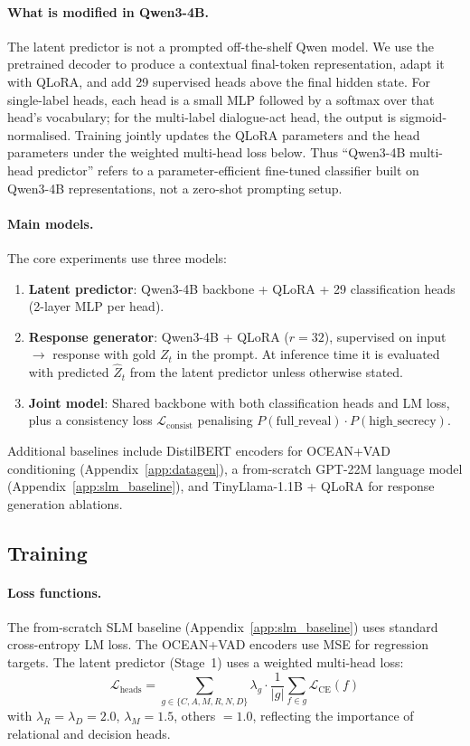 \documentclass[11pt]{article}
\begin{document}
\paragraph{What is modified in Qwen3-4B.}
The latent predictor is not a prompted off-the-shelf Qwen model.
We use the pretrained decoder to produce a contextual final-token representation, adapt it with QLoRA, and add 29 supervised heads above the final hidden state.
For single-label heads, each head is a small MLP followed by a softmax over that head's vocabulary; for the multi-label dialogue-act head, the output is sigmoid-normalised.
Training jointly updates the QLoRA parameters and the head parameters under the weighted multi-head loss below.
Thus ``Qwen3-4B multi-head predictor'' refers to a parameter-efficient fine-tuned classifier built on Qwen3-4B representations, not a zero-shot prompting setup.

\paragraph{Main models.}
The core experiments use three models:
\begin{enumerate}
    \item \textbf{Latent predictor}: Qwen3-4B backbone + QLoRA + 29 classification heads (2-layer MLP per head).
    \item \textbf{Response generator}: Qwen3-4B + QLoRA ($r=32$), supervised on input $\to$ response with gold $Z_t$ in the prompt. At inference time it is evaluated with predicted $\hat{Z}_t$ from the latent predictor unless otherwise stated.
    \item \textbf{Joint model}: Shared backbone with both classification heads and LM loss, plus a consistency loss $\mathcal{L}_\text{consist}$ penalising $P(\text{full\_reveal}) \cdot P(\text{high\_secrecy})$.
\end{enumerate}

Additional baselines include DistilBERT encoders for OCEAN+VAD conditioning (Appendix~\ref{app:datagen}), a from-scratch GPT-22M language model (Appendix~\ref{app:slm_baseline}), and TinyLlama-1.1B + QLoRA for response generation ablations.

\subsection{Training}
\label{sec:training}

\paragraph{Loss functions.}
The from-scratch SLM baseline (Appendix~\ref{app:slm_baseline}) uses standard cross-entropy LM loss.
The OCEAN+VAD encoders use MSE for regression targets.
The latent predictor (Stage~1) uses a weighted multi-head loss:
\begin{equation}
    \mathcal{L}_\text{heads} = \sum_{g \in \{C,A,M,R,N,D\}} \lambda_g \cdot \frac{1}{|g|} \sum_{f \in g} \mathcal{L}_\text{CE}(f)
\end{equation}
with $\lambda_R = \lambda_D = 2.0$, $\lambda_M = 1.5$, others $= 1.0$, reflecting the importance of relational and decision heads.
\end{document}
